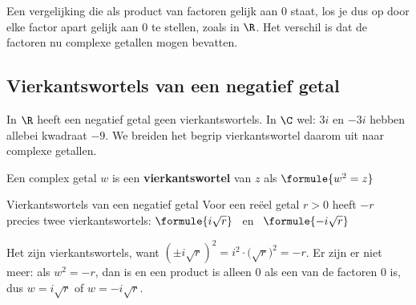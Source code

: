Een vergelijking die als product van factoren gelijk aan 0 staat, los je dus op door elke factor apart gelijk aan 0 te stellen, zoals in $\R$. Het verschil is dat de factoren nu complexe getallen mogen bevatten.


\begin{oefeningen}
\end{oefeningen}

\subsection{Vierkantswortels van een negatief getal}

In $\R$ heeft een negatief getal geen vierkantswortels. In $\C$ wel: $3i$ en $-3i$ hebben allebei kwadraat $-9$. We breiden het begrip vierkantswortel daarom uit naar complexe getallen.

\begin{theorie}
Een complex getal $w$ is een \textbf{\textcolor{accent}{vierkantswortel}} van $z$ als \quad $\formule{w^2 = z}$

\begin{stelling}{Vierkantswortels van een negatief getal}
Voor een reëel getal $r > 0$ heeft $-r$ precies twee vierkantswortels: \quad $\formule{i\sqrt{r}}$ \ en \ $\formule{-i\sqrt{r}}$
\end{stelling}

\begin{bewijs}
Het zijn vierkantswortels, want $(\pm i\sqrt{r})^2 = i^2 \cdot \bigl(\sqrt{r}\bigr)^2 = -r$. Er zijn er niet meer: als $w^2 = -r$, dan is
en een product is alleen 0 als een van de factoren 0 is, dus $w = i\sqrt{r}$ of $w = -i\sqrt{r}$.
\end{bewijs}
\end{theorie}

